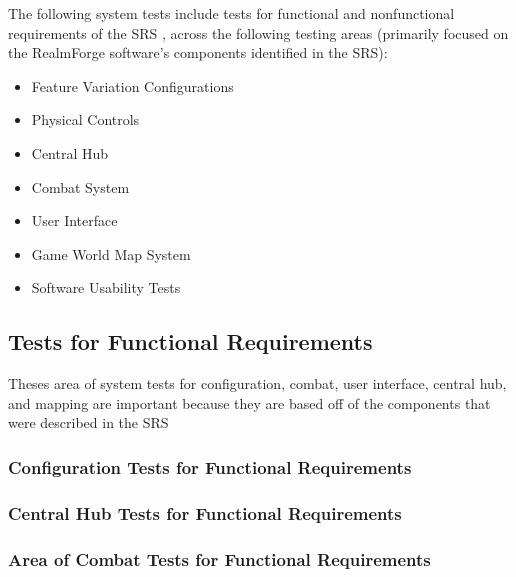 \documentclass[12pt, titlepage]{article}
\begin{document}
The following system tests include tests for functional and nonfunctional 
requirements of the SRS \cite{SRS}, across the following testing areas 
(primarily 
focused on the RealmForge software's components identified in the SRS):

\begin{itemize}
	\item Feature Variation Configurations
	\item Physical Controls
	\item Central Hub
	\item Combat System
	\item User Interface
	\item Game World Map System
	\item Software Usability Tests
\end{itemize}

\subsection{Tests for Functional Requirements}



Theses area of  system tests for configuration, combat, user interface, central hub, and mapping are important because
they are based off of the components that were described in the SRS\cite{SRS} 

\subsubsection{Configuration Tests for Functional Requirements}



\subsubsection{Central Hub Tests for Functional Requirements}


\subsubsection{Area of Combat Tests for Functional Requirements}
\end{document}
